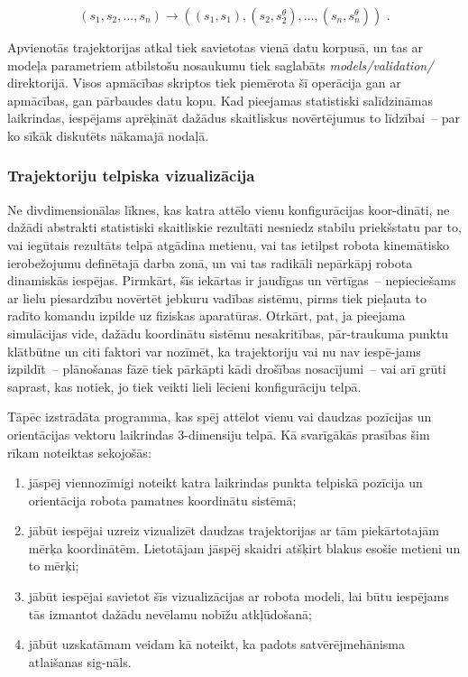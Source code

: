 \documentclass[12pt, a4paper]{article}
\numberwithin{equation}{section} %
\begin{document}
\begin{equation}
    (s_1, s_2, ..., s_n) \rightarrow \left ( (s_1, s_1), (s_2, s^{\theta}_2), ...,      (s_n, s^{\theta}_n) \right )
\text{ .}
\end{equation}

Apvienotās trajektorijas atkal tiek savietotas vienā datu korpusā, un tas ar modeļa parametriem atbilstošu nosaukumu tiek saglabāts \textit{models/validation/} direktorijā. Visos apmācības skriptos tiek piemērota šī operācija gan ar apmācības, gan pārbaudes datu kopu. Kad pieejamas statistiski salīdzināmas laikrindas, iespējams aprēķināt dažādus skaitliskus novērtējumus to līdzībai~-- par ko sīkāk diskutēts nākamajā nodaļā.

\subsubsection{Trajektoriju telpiska vizualizācija}

Ne divdimensionālas līknes, kas katra attēlo vienu konfigurācijas koor-dināti, ne dažādi abstrakti statistiski skaitliskie rezultāti nesniedz stabilu priekšstatu par to, vai iegūtais rezultāts telpā atgādina metienu, vai tas ietilpst robota kinemātisko ierobežojumu definētajā darba zonā, un vai tas radikāli nepārkāpj robota dinamiskās iespējas. Pirmkārt, šīs iekārtas ir jaudīgas un vērtīgas~-- nepieciešams ar lielu piesardzību novērtēt jebkuru vadības sistēmu, pirms tiek pieļauta to radīto komandu izpilde uz fiziskas aparatūras. Otrkārt, pat, ja pieejama simulācijas vide, dažādu koordinātu sistēmu nesakritības, pār-traukuma punktu klātbūtne un citi faktori var nozīmēt, ka trajektoriju vai nu nav iespē-jams izpildīt~-- plānošanas fāzē tiek pārkāpti kādi drošības nosacījumi~-- vai arī grūti saprast, kas notiek, jo tiek veikti lieli lēcieni konfigurāciju telpā.

Tāpēc izstrādāta programma, kas spēj attēlot vienu vai daudzas pozīcijas un orientācijas vektoru laikrindas 3-dimensiju telpā. Kā svarīgākās prasības šim rīkam noteiktas sekojošās:

\begin{enumerate}
    \item jāspēj viennozīmigi noteikt katra laikrindas punkta telpiskā pozīcija un orientācija robota pamatnes koordinātu sistēmā;
    \item jābūt iespējai uzreiz vizualizēt daudzas trajektorijas ar tām piekārtotajām mērķa koordinātēm. Lietotājam jāspēj skaidri atšķirt blakus esošie metieni un to mērķi;
    \item jābūt iespējai savietot šīs vizualizācijas ar robota modeli, lai būtu iespējams tās izmantot dažādu nevēlamu nobīžu atkļūdošanā;
    \item jābūt uzskatāmam veidam kā noteikt, ka padots satvērējmehānisma atlaišanas sig-nāls.
\end{enumerate}
\end{document}

